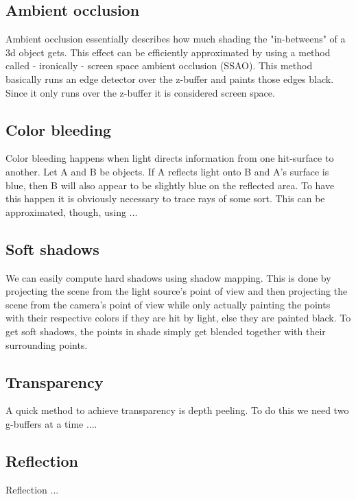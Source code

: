 \documentclass{ACGSeminar}
\begin{document}
	\subsection{Ambient occlusion}
		Ambient occlusion essentially describes how much shading the "in-betweens" of a 3d object gets. This effect can be efficiently approximated by using a method called - ironically - screen space ambient occlusion (SSAO). This method basically runs an edge detector over the z-buffer and paints those edges black. Since it only runs over the z-buffer it is considered screen space.

	\subsection{Color bleeding}
		Color bleeding happens when light directs information from one hit-surface to another. Let A and B be objects. If A reflects light onto B and A's surface is blue, then B will also appear
		to be slightly blue on the reflected area. To have this happen it is obviously necessary to trace rays of some sort. This can be approximated, though, using ... %

	\subsection{Soft shadows}
		We can easily compute hard shadows using shadow mapping. This is done by projecting the scene from the light source's point of view and then projecting the scene from the camera's point of view while only actually painting the points with their respective colors if they are hit by light, else they are painted black. To get soft shadows, the points in shade simply get blended together with their surrounding points.

	\subsection{Transparency}
		A quick method to achieve transparency is depth peeling. To do this we need two g-buffers at a time ...\cite{NOIT}.

	\subsection{Reflection}
		Reflection ...
\end{document}
